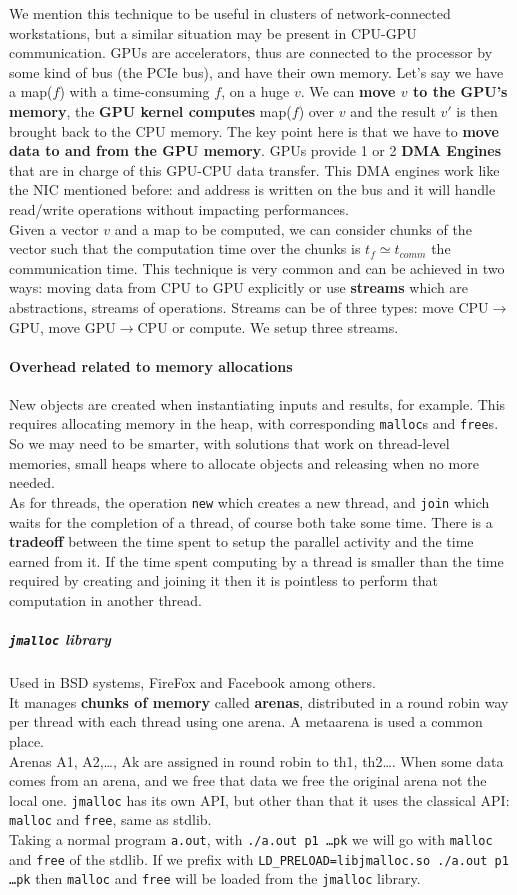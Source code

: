 \documentclass[10pt]{report}
\begin{document}
We mention this technique to be useful in clusters of network-connected workstations, but a similar situation may be present in CPU-GPU communication. GPUs are accelerators, thus are connected to the processor by some kind of bus (the PCIe bus), and have their own memory. Let's say we have a map($f$) with a time-consuming $f$, on a huge $v$. We can \textbf{move $v$ to the GPU's memory}, the \textbf{GPU kernel computes} map($f$) over $v$ and the result $v'$ is then brought back to the CPU memory. The key point here is that we have to \textbf{move data to and from the GPU memory}. GPUs provide 1 or 2 \textbf{DMA Engines} that are in charge of this GPU-CPU data transfer. This DMA engines work like the NIC mentioned before: and address is written on the bus and it will handle read/write operations without impacting performances.\\
Given a vector $v$ and a map to be computed, we can consider chunks of the vector such that the computation time over the chunks is $t_f\simeq t_{comm}$ the communication time. This technique is very common and can be achieved in two ways: moving data from CPU to GPU explicitly or use \textbf{streams} which are abstractions, streams of operations. Streams can be of three types: move CPU$\rightarrow$GPU, move GPU$\rightarrow$CPU or compute. We setup three streams.
\paragraph{Overhead related to memory allocations} New objects are created when instantiating inputs and results, for example. This requires allocating memory in the heap, with corresponding \texttt{malloc}s and \texttt{free}s. So we may need to be smarter, with solutions that work on thread-level memories, small heaps where to allocate objects and releasing when no more needed.\\
As for threads, the operation \texttt{new} which creates a new thread, and \texttt{join} which waits for the completion of a thread, of course both take some time. There is a \textbf{tradeoff} between the time spent to setup the parallel activity and the time earned from it. If the time spent computing by a thread is smaller than the time required by creating and joining it then it is pointless to perform that computation in another thread.
\subparagraph{\texttt{jmalloc} library} Used in BSD systems, FireFox and Facebook among others.\\
It manages \textbf{chunks of memory} called \textbf{arenas}, distributed in a round robin way per thread with each thread using one arena. A metaarena is used a common place.\\
Arenas A1, A2,\ldots, Ak are assigned in round robin to th1, th2\ldots. When some data comes from an arena, and we free that data we free the original arena not the local one. \texttt{jmalloc} has its own API, but other than that it uses the classical API: \texttt{malloc} and \texttt{free}, same as stdlib.\\
Taking a normal program \texttt{a.out}, with \texttt{./a.out p1 \ldots pk} we will go with \texttt{malloc} and \texttt{free} of the stdlib. If we prefix with \texttt{LD\_PRELOAD=libjmalloc.so ./a.out p1 \ldots pk} then \texttt{malloc} and \texttt{free} will be loaded from the \texttt{jmalloc} 
library.
\end{document}
